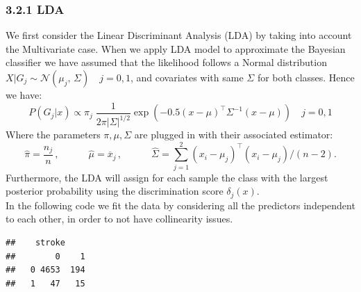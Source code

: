 \documentclass[
]{article}
\newenvironment{Shaded}{\begin{snugshade}}{\end{snugshade}}
\newcommand{\DecValTok}[1]{\textcolor[rgb]{0.00,0.00,0.81}{#1}}
\newcommand{\FunctionTok}[1]{\textcolor[rgb]{0.00,0.00,0.00}{#1}}
\newcommand{\NormalTok}[1]{#1}
\newcommand{\OtherTok}[1]{\textcolor[rgb]{0.56,0.35,0.01}{#1}}
\newcommand{\SpecialCharTok}[1]{\textcolor[rgb]{0.00,0.00,0.00}{#1}}
\begin{document}
\hypertarget{lda}{%
\subsubsection{3.2.1 LDA}\label{lda}}

We first consider the Linear Discriminant Analysis (LDA) by taking into
account the Multivariate case. When we apply LDA model to approximate
the Bayesian classifier we have assumed that the likelihood follows a
Normal distribution
\(X|G_j \sim \mathcal{N}(\mu_j,\,\Sigma) \quad j=0, 1\), and covariates
with same \(\Sigma\) for both classes. Hence we have:
\[P(G_j | x) \propto \pi_j \; \frac{1}{2\pi |\Sigma|^{1/2}} \exp \left(-0.5 (x - \mu)^\top \Sigma^{-1} (x-\mu) \right) \quad j=0,1 \]
Where the parameters \(\pi, \mu, \Sigma\) are plugged in with their
associated estimator:
\[\hat\pi = \frac{n_j}{n}\,, \qquad \quad\hat\mu = \overline x_j\,, \qquad \quad\hat\Sigma = \sum_{j=1}^{2} (x_i-\mu_j)^\top (x_i-\mu_j) / (n-2).\]
Furthermore, the LDA will assign for each sample the class with the
largest posterior probability using the discrimination score
\(\delta_j(x)\).\\
In the following code we fit the data by considering all the predictors
independent to each other, in order to not have collinearity issues.

\begin{Shaded}
\end{Shaded}

\begin{verbatim}
##    stroke
##        0    1
##   0 4653  194
##   1   47   15
\end{verbatim}
\end{document}
